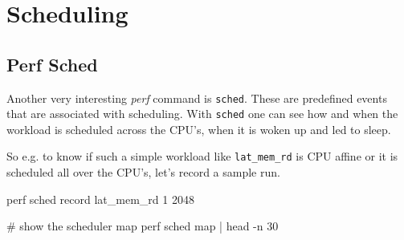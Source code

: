 \chapter{Scheduling}
\section{Perf Sched}

Another very interesting {\em perf} command is {\tt sched}. These are predefined events
that are associated with scheduling. With {\tt sched} one can see how and when the
workload is scheduled across the CPU's, when it is woken up and led to sleep.

So e.g. to know if such a simple workload like {\tt lat_mem_rd} is CPU affine or it is
scheduled all over the CPU's, let's record a sample run.

\starttyping
perf sched record lat_mem_rd 1 2048
\stoptyping

\starttyping
# show the scheduler map
perf sched map | head -n 30

